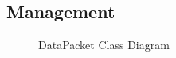 \documentclass[12pt,a4paper]{article}
\title{}
\author{}
\begin{document}
\begin{titlingpage}
	
\end{titlingpage}


\tableofcontents










\newpage
\raggedright



\appendix



\begin{landscape}
	\section{Management}
\end{landscape}

\begin{figure}
	
	\caption{DataPacket Class Diagram}
\end{figure}
\end{document}
